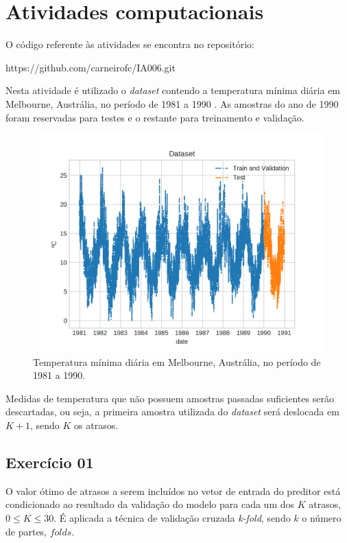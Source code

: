\documentclass{article}
\begin{document}
    \section[]{Atividades computacionais}
    O código referente às atividades se encontra no repositório:
    
    https://github.com/carneirofc/IA006.git\linebreak

    Nesta atividade é utilizado o \textit{dataset} contendo a temperatura mínima
    diária em Melbourne, Austrália, no período de 1981 a 1990 . As amostras do ano
    de 1990 foram reservadas para testes e o restante para treinamento e validação.
    \begin{figure}[!ht]
        \centering
        \includegraphics[width=\linewidth]{ex01/dataset.png}
        \caption{Temperatura mínima diária em Melbourne, Austrália, no período de 1981 a 1990.}
        \label{fig:dataset}
    \end{figure}
    
    Medidas de temperatura que não possuem amostras passadas suficientes serão descartadas, ou seja,
    a primeira amostra utilizada do \textit{dataset} será deslocada em $K + 1$, sendo $K$ os atrasos.
    \subsection[]{Exercício 01}
    O valor ótimo de atrasos a serem incluídos no vetor de entrada do preditor está condicionado
    ao resultado da validação do modelo para cada um dos $K$ atrasos, $0\leqslant K \leqslant  30$.
    É aplicada a técnica de validação cruzada \textit{k-fold}, sendo $k$ o número de partes, $folds$.
\end{document}
